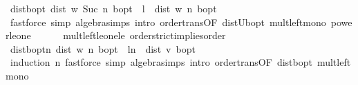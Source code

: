 \begin{isabellebody}
\isanewline
{}\isamarkupfalse%
\ dist{\isacharunderscore}{\kern0pt}{\isasymnu}\isactrlsub b{\isacharunderscore}{\kern0pt}opt{\isacharcolon}{\kern0pt}\ {\isachardoublequoteopen}dist\ {\isacharparenleft}{\kern0pt}w\ {\isacharparenleft}{\kern0pt}Suc\ n{\isacharparenright}{\kern0pt}{\isacharparenright}{\kern0pt}\ {\isasymnu}\isactrlsub b{\isacharunderscore}{\kern0pt}opt\ {\isasymle}\ l\ {\isacharasterisk}{\kern0pt}\ dist\ {\isacharparenleft}{\kern0pt}w\ n{\isacharparenright}{\kern0pt}\ {\isasymnu}\isactrlsub b{\isacharunderscore}{\kern0pt}opt{\isachardoublequoteclose}\isanewline
%
\isadelimproof
\ \ %
\endisadelimproof
%
\isatagproof
{}\isamarkupfalse%
\ {\isacharparenleft}{\kern0pt}fastforce\ simp{\isacharcolon}{\kern0pt}\ algebra{\isacharunderscore}{\kern0pt}simps\ intro{\isacharcolon}{\kern0pt}\ order{\isachardot}{\kern0pt}trans{\isacharbrackleft}{\kern0pt}OF\ dist{\isacharunderscore}{\kern0pt}U\isactrlsub b{\isacharunderscore}{\kern0pt}opt{\isacharbrackright}{\kern0pt}\ mult{\isacharunderscore}{\kern0pt}left{\isacharunderscore}{\kern0pt}mono\ power{\isacharunderscore}{\kern0pt}le{\isacharunderscore}{\kern0pt}one\isanewline
\ \ \ \ \ \ mult{\isacharunderscore}{\kern0pt}left{\isacharunderscore}{\kern0pt}le{\isacharunderscore}{\kern0pt}one{\isacharunderscore}{\kern0pt}le\ order{\isachardot}{\kern0pt}strict{\isacharunderscore}{\kern0pt}implies{\isacharunderscore}{\kern0pt}order{\isacharparenright}{\kern0pt}%
\endisatagproof
{\isafoldproof}%
%
\isadelimproof
\isanewline
%
\endisadelimproof
\isanewline
{}\isamarkupfalse%
\ dist{\isacharunderscore}{\kern0pt}{\isasymnu}\isactrlsub b{\isacharunderscore}{\kern0pt}opt{\isacharunderscore}{\kern0pt}n{\isacharcolon}{\kern0pt}\ {\isachardoublequoteopen}dist\ {\isacharparenleft}{\kern0pt}w\ n{\isacharparenright}{\kern0pt}\ {\isasymnu}\isactrlsub b{\isacharunderscore}{\kern0pt}opt\ {\isasymle}\ l{\isacharcircum}{\kern0pt}n\ {\isacharasterisk}{\kern0pt}\ dist\ v{}\ {\isasymnu}\isactrlsub b{\isacharunderscore}{\kern0pt}opt{\isachardoublequoteclose}\isanewline
%
\isadelimproof
\ \ %
\endisadelimproof
%
\isatagproof
{}\isamarkupfalse%
\ {\isacharparenleft}{\kern0pt}induction\ n{\isacharparenright}{\kern0pt}\ {\isacharparenleft}{\kern0pt}fastforce\ simp{\isacharcolon}{\kern0pt}\ algebra{\isacharunderscore}{\kern0pt}simps\ intro{\isacharcolon}{\kern0pt}\ order{\isachardot}{\kern0pt}trans{\isacharbrackleft}{\kern0pt}OF\ dist{\isacharunderscore}{\kern0pt}{\isasymnu}\isactrlsub b{\isacharunderscore}{\kern0pt}opt{\isacharbrackright}{\kern0pt}\ mult{\isacharunderscore}{\kern0pt}left{\isacharunderscore}{\kern0pt}mono{\isacharparenright}{\kern0pt}{\isacharplus}{\kern0pt}%

\end{isabellebody}
